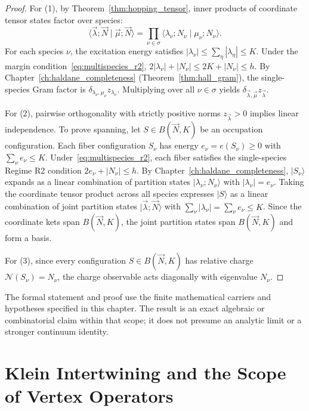 \begin{proof}
For (1), by Theorem~\ref{thm:hopping_tensor}, inner products of coordinate tensor states factor over species:
\[
\langle \vec{\lambda}; \vec{N} \mid \vec{\mu}; \vec{N} \rangle = \prod_{\nu \in \sigma} \langle \lambda_\nu; N_\nu \mid \mu_\nu; N_\nu \rangle.
\]
For each species $\nu$, the excitation energy satisfies $|\lambda_\nu| \le \sum_{\eta} |\lambda_\eta| \le K$.
Under the margin condition~\eqref{eq:multispecies_r2}, $2|\lambda_\nu| + |N_\nu| \le 2K + |N_\nu| \le h$.
By Chapter~\ref{ch:haldane_completeness} (Theorem~\ref{thm:hall_gram}), the single-species Gram factor is $\delta_{\lambda_\nu, \mu_\nu} z_{\lambda_\nu}$.
Multiplying over all $\nu \in \sigma$ yields $\delta_{\vec{\lambda}, \vec{\mu}} z_{\vec{\lambda}}$.

For (2), pairwise orthogonality with strictly positive norms $z_{\vec{\lambda}} > 0$ implies linear independence.
To prove spanning, let $S \in B(\vec{N}, K)$ be an occupation configuration. Each fiber configuration $S_\nu$ has energy $e_\nu = e(S_\nu) \ge 0$ with $\sum_\nu e_\nu \le K$.
Under~\eqref{eq:multispecies_r2}, each fiber satisfies the single-species Regime R2 condition $2e_\nu + |N_\nu| \le h$.
By Chapter~\ref{ch:haldane_completeness}, $|S_\nu\rangle$ expands as a linear combination of partition states $|\lambda_\nu; N_\nu\rangle$ with $|\lambda_\nu| = e_\nu$.
Taking the coordinate tensor product across all species expresses $|S\rangle$ as a linear combination of joint partition states $|\vec{\lambda}; \vec{N}\rangle$ with $\sum_\nu |\lambda_\nu| = \sum_\nu e_\nu \le K$.
Since the coordinate kets span $B(\vec{N}, K)$, the joint partition states span $B(\vec{N}, K)$ and form a basis.

For (3), since every configuration $S \in B(\vec{N}, K)$ has relative charge $\mathcal{N}(S_\nu) = N_\nu$, the charge observable acts diagonally with eigenvalue $N_\nu$.
\end{proof}

\begin{remark}
The formal statement and proof use the finite mathematical carriers and hypotheses specified in this chapter. The result is an exact algebraic or combinatorial claim within that scope; it does not presume an analytic limit or a stronger continuum identity.
\end{remark}

\section{Klein Intertwining and the Scope of Vertex Operators}

